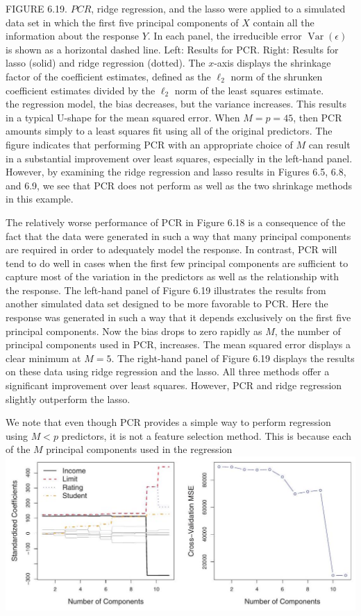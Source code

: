 \documentclass[10pt]{article}
\begin{document}
FIGURE 6.19. $P C R$, ridge regression, and the lasso were applied to a simulated data set in which the first five principal components of $X$ contain all the information about the response $Y$. In each panel, the irreducible error $\operatorname{Var}(\epsilon)$ is shown as a horizontal dashed line. Left: Results for PCR. Right: Results for lasso (solid) and ridge regression (dotted). The $x$-axis displays the shrinkage factor of the coefficient estimates, defined as the $\ell_{2}$ norm of the shrunken coefficient estimates divided by the $\ell_{2}$ norm of the least squares estimate.\\
the regression model, the bias decreases, but the variance increases. This results in a typical U-shape for the mean squared error. When $M=p=45$, then PCR amounts simply to a least squares fit using all of the original predictors. The figure indicates that performing PCR with an appropriate choice of $M$ can result in a substantial improvement over least squares, especially in the left-hand panel. However, by examining the ridge regression and lasso results in Figures 6.5, 6.8, and 6.9, we see that PCR does not perform as well as the two shrinkage methods in this example.

The relatively worse performance of PCR in Figure 6.18 is a consequence of the fact that the data were generated in such a way that many principal components are required in order to adequately model the response. In contrast, PCR will tend to do well in cases when the first few principal components are sufficient to capture most of the variation in the predictors as well as the relationship with the response. The left-hand panel of Figure 6.19 illustrates the results from another simulated data set designed to be more favorable to PCR. Here the response was generated in such a way that it depends exclusively on the first five principal components. Now the bias drops to zero rapidly as $M$, the number of principal components used in PCR, increases. The mean squared error displays a clear minimum at $M=5$. The right-hand panel of Figure 6.19 displays the results on these data using ridge regression and the lasso. All three methods offer a significant improvement over least squares. However, PCR and ridge regression slightly outperform the lasso.

We note that even though PCR provides a simple way to perform regression using $M<p$ predictors, it is not a feature selection method. This is because each of the $M$ principal components used in the regression\\
\includegraphics[max width=\textwidth, center]{2025_05_05_efe77898333945044de4g-251}
\end{document}
